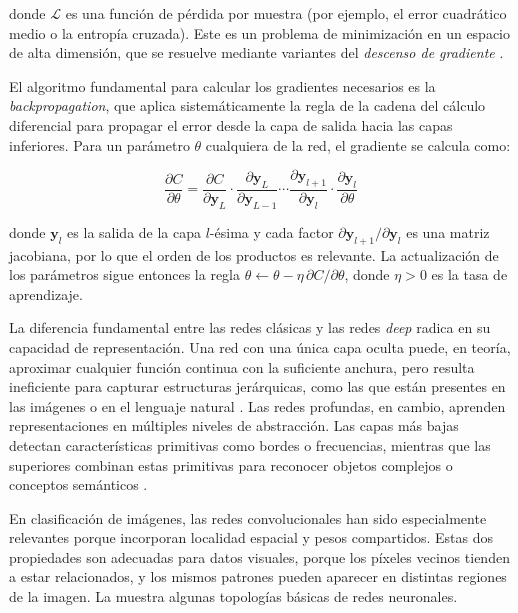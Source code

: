 donde $\mathcal{L}$ es una función de pérdida por muestra (por ejemplo, el error cuadrático medio o la entropía cruzada). Este es un problema de minimización en un espacio de alta dimensión, que se resuelve mediante variantes del \textit{descenso de gradiente} .

El algoritmo fundamental para calcular los gradientes necesarios es la \textit{backpropagation}, que aplica sistemáticamente la regla de la cadena del cálculo diferencial para propagar el error desde la capa de salida hacia las capas inferiores. Para un parámetro $\theta$ cualquiera de la red, el gradiente se calcula como:

\begin{equation} \label{eq: backprop}
    \frac{\partial C}{\partial \theta} = \frac{\partial C}{\partial \mathbf{y}_L} \cdot \frac{\partial \mathbf{y}_L}{\partial \mathbf{y}_{L-1}} \cdots \frac{\partial \mathbf{y}_{l+1}}{\partial \mathbf{y}_l} \cdot \frac{\partial \mathbf{y}_l}{\partial \theta}
\end{equation}

donde $\mathbf{y}_l$ es la salida de la capa $l$-ésima y cada factor $\partial \mathbf{y}_{l+1} / \partial \mathbf{y}_l$ es una matriz jacobiana, por lo que el orden de los productos es relevante. La actualización de los parámetros sigue entonces la regla $\theta \leftarrow \theta - \eta \, \partial C / \partial \theta$, donde $\eta > 0$ es la tasa de aprendizaje.

La diferencia fundamental entre las redes clásicas y las redes \textit{deep} radica en su capacidad de representación. Una red con una única capa oculta puede, en teoría, aproximar cualquier función continua con la suficiente anchura, pero resulta ineficiente para capturar estructuras jerárquicas, como las que están presentes en las imágenes o en el lenguaje natural . Las redes profundas, en cambio, aprenden representaciones en múltiples niveles de abstracción. Las capas más bajas detectan características primitivas como bordes o frecuencias, mientras que las superiores combinan estas primitivas para reconocer objetos complejos o conceptos semánticos .

En clasificación de imágenes, las redes convolucionales han sido especialmente relevantes porque incorporan localidad espacial y pesos compartidos. Estas dos propiedades son adecuadas para datos visuales, porque los píxeles vecinos tienden a estar relacionados, y los mismos patrones pueden aparecer en distintas regiones de la imagen. La  muestra algunas topologías básicas de redes neuronales.

